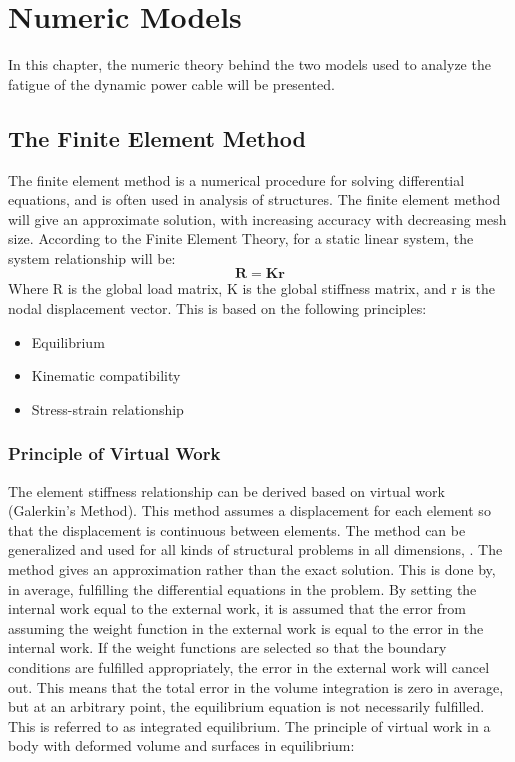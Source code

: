 \chapter{Numeric Models}
\label{chap:numeric}
In this chapter, the numeric theory behind the two models used to analyze the fatigue of the dynamic power cable will be presented.

\section{The Finite Element Method}
The finite element method is a numerical procedure for solving differential equations, and is often used in analysis of structures. The finite element method will give an approximate solution, with increasing accuracy with decreasing mesh size. According to the Finite Element Theory, for a static linear system, the system relationship will be:
\begin{equation}
    \boldsymbol{R}= \boldsymbol{K}\boldsymbol{r}
\end{equation}
Where R is the global load matrix, K is the global stiffness matrix, and r is the nodal displacement vector.\newline
\newline
This is based on the following principles:
\begin{itemize}
    \item Equilibrium
    \item Kinematic compatibility
    \item Stress-strain relationship
\end{itemize}
 \cite{moan2003}
\subsection{Principle of Virtual Work}
The element stiffness relationship can be derived based on virtual work (Galerkin's Method). This method assumes a displacement for each element so that the displacement is continuous between elements. The method can be generalized and used for all kinds of structural problems in all dimensions, \cite{moan2003}. The method gives an approximation rather than the exact solution. This is done by,  in average, fulfilling the differential equations in the problem. By setting the internal work equal to the external work, it is assumed that the error from assuming the weight function in the external work is equal to the error in the internal work. If the weight functions are selected so that the boundary conditions are fulfilled appropriately, the error in the external work will cancel out. This means that the total error in the volume integration is zero in average, but at an arbitrary point, the equilibrium equation is not necessarily fulfilled. This is referred to as integrated equilibrium. The principle of virtual work in a body with deformed volume and surfaces in equilibrium:   

